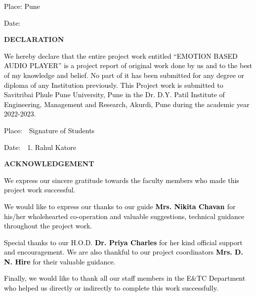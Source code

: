 \documentclass[a4paper]{article}
\begin{document}
\bigskip


\bigskip

\textcolor{black}{Place: Pune}

\textcolor{black}{Date:}

\clearpage\setcounter{page}{1}\pagestyle{Convertedii}
{\centering
\textbf{DECLARATION}
\par}


\bigskip

\textcolor{black}{We hereby declare that the entire project work entitled ``EMOTION BASED AUDIO PLAYER'' is a project
report of original work done by us and to the best of my knowledge and belief. No part of it has been submitted for any
degree or diploma of any Institution previously. This Project work is submitted to Savitribai Phule Pune University,
Pune in the Dr. D.Y. Patil Institute of Engineering, Management and Research, Akurdi, Pune during the academic year
2022-2023.}


\bigskip


\bigskip


\bigskip

\textcolor{black}{Place:\ \ Signature of Students}

\textcolor{black}{Date:\ \ 1. Rahul Katore}


\bigskip


\bigskip


\bigskip

{\centering
\textbf{ACKNOWLEDGEMENT}
\par}


\bigskip

\textcolor{black}{We express our sincere gratitude towards the faculty members who made this project work successful.}

\textcolor{black}{We would like to express our thanks to our guide }\textbf{\textcolor{black}{Mrs. Nikita Chavan
}}\textcolor{black}{for his/her wholehearted co-operation and valuable suggestions, technical guidance throughout the
project work.}

\textcolor{black}{Special thanks to our H.O.D. }\textbf{\textcolor{black}{Dr. Priya Charles}}\textcolor{black}{ for her
kind official support and encouragement. We are also thankful to our project coordinators
}\textbf{\textcolor{black}{Mrs. D. N. Hire}}\textcolor{black}{ for their valuable guidance.}

\textcolor{black}{Finally, we would like to thank all our staff members in the E\&TC Department who helped us directly
or indirectly to complete this work successfully.}
\end{document}
